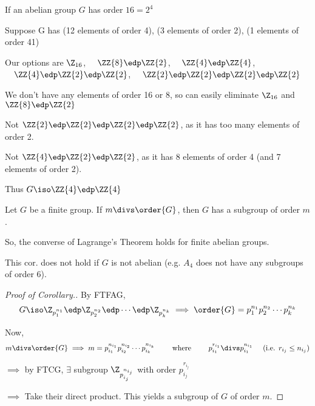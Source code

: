 \begin{example}
If an abelian group \(G\) has order \(16 = 2^4\)

Suppose G has (12 elements of order 4), (3 elements of order 2), (1 elements of order 41)

Our options are \(\Z_{16}\), \(\quad \ZZ{8}\edp\ZZ{2}\), \(\quad\ZZ{4}\edp\ZZ{4}\), \(\quad\ZZ{4}\edp\ZZ{2}\edp\ZZ{2}\), \(\quad\ZZ{2}\edp\ZZ{2}\edp\ZZ{2}\edp\ZZ{2}\)

We don't have any elements of order 16 or 8, so can easily eliminate \(\Z_{16}\) and \(\ZZ{8}\edp\ZZ{2}\)

Not \(\ZZ{2}\edp\ZZ{2}\edp\ZZ{2}\edp\ZZ{2}\), as it has too many elements of order 2.

Not \(\ZZ{4}\edp\ZZ{2}\edp\ZZ{2}\), as it has 8 elements of order 4 (and 7 elements of order 2).

Thus \(G \iso \ZZ{4}\edp\ZZ{4}\)
\end{example}

\begin{corollary}
Let \(G\) be a finite  group. If \(m\divs \order{G}\), then \(G\) has a subgroup of order \(m\).
\end{corollary}

So, the converse of Lagrange's Theorem holds for finite abelian groups.

\begin{remark}
This cor. does not hold if \(G\) is not abelian (e.g. \(A_4\) does not have any subgroups of order \(6\)).
\end{remark}

\begin{proof}[Proof of Corollary.]

By FTFAG, \begin{align*}
G \iso \Z_{p_1^{n_1}} \edp \Z_{p_2^{n_2}} \edp \cdots \edp \Z_{p_k^{n_k}} \implies \order{G} = p_1^{n_1}p_2^{n_2}\cdots p_k^{n_k}
\end{align*}

Now, \begin{align*}
m\divs\order{G} \implies m = p_{i_1}^{n_{i_1}}p_{i_2}^{n_{i_2}}\cdots p_{i_k}^{n_{i_k}}
\qquad \text{ where } \qquad
p_{i_1}^{r_{i_1}} \divs p_{i_1}^{n_{i_1}} \quad \text{ (i.e. \(r_{i_j}\leq n_{i_j}\))}
\end{align*}

\(\implies\) by FTCG, \(\exists\) subgroup \(\Z_{p_{i_j}^{n_{i_j}}}\) with order \(p_{i_j}^{r_{i_j}}\)

\(\implies\) Take their direct product. This yields a subgroup of \(G\) of order \(m\).
\end{proof}

